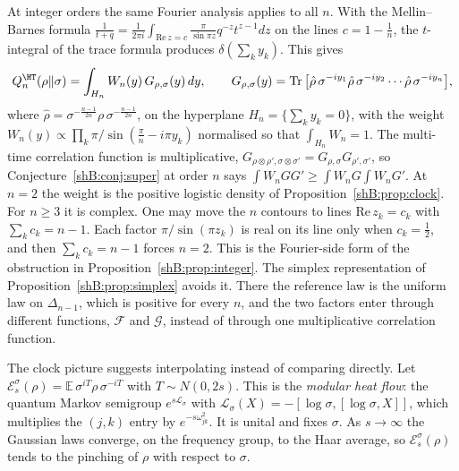 At integer orders the same Fourier analysis applies to all $n$. With the Mellin--Barnes formula $\frac1{t+q}=\frac1{2\pi i}\int_{\mathrm{Re}\,z=c}\frac{\pi}{\sin\pi z}q^{-z}t^{z-1}dz$ on the lines $c=1-\frac1n$, the $t$-integral of the trace formula produces $\delta(\sum_ky_k)$. This gives
\[
Q^\HT_n(\rho\|\sigma)=\int_{H_n}W_n(y)\,G_{\rho,\sigma}(y)\,dy,\qquad G_{\rho,\sigma}(y)=\Tr\big[\hat\rho\,\sigma^{-iy_1}\hat\rho\,\sigma^{-iy_2}\cdots\hat\rho\,\sigma^{-iy_n}\big],
\]
where $\hat\rho=\sigma^{-\frac{n-1}{2n}}\rho\,\sigma^{-\frac{n-1}{2n}}$, on the hyperplane $H_n=\{\sum_ky_k=0\}$, with the weight $W_n(y)\propto\prod_k\pi/\sin(\frac\pi n-i\pi y_k)$ normalised so that $\int_{H_n}W_n=1$. The multi-time correlation function is multiplicative, $G_{\rho\otimes\rho',\sigma\otimes\sigma'}=G_{\rho,\sigma}G_{\rho',\sigma'}$, so Conjecture~\ref{shB:conj:super} at order $n$ says $\int W_nGG'\ge\int W_nG\int W_nG'$. At $n=2$ the weight is the positive logistic density of Proposition~\ref{shB:prop:clock}. For $n\ge3$ it is complex. One may move the $n$ contours to lines $\mathrm{Re}\,z_k=c_k$ with $\sum_kc_k=n-1$. Each factor $\pi/\sin(\pi z_k)$ is real on its line only when $c_k=\frac12$, and then $\sum_kc_k=n-1$ forces $n=2$. This is the Fourier-side form of the obstruction in Proposition~\ref{shB:prop:integer}. The simplex representation of Proposition~\ref{shB:prop:simplex} avoids it. There the reference law is the uniform law on $\Delta_{n-1}$, which is positive for every $n$, and the two factors enter through different functions, $\mathcal F$ and $\mathcal G$, instead of through one multiplicative correlation function.

The clock picture suggests interpolating instead of comparing directly. Let $\mathcal E^\sigma_s(\rho)=\mathbb E\,\sigma^{iT}\rho\,\sigma^{-iT}$ with $T\sim N(0,2s)$. This is the \emph{modular heat flow}: the quantum Markov semigroup $e^{s\mathcal L_\sigma}$ with $\mathcal L_\sigma(X)=-[\log\sigma,[\log\sigma,X]]$, which multiplies the $(j,k)$ entry by $e^{-s\omega_{jk}^2}$. It is unital and fixes $\sigma$. As $s\to\infty$ the Gaussian laws converge, on the frequency group, to the Haar average, so $\mathcal E^\sigma_s(\rho)$ tends to the pinching of $\rho$ with respect to $\sigma$.

